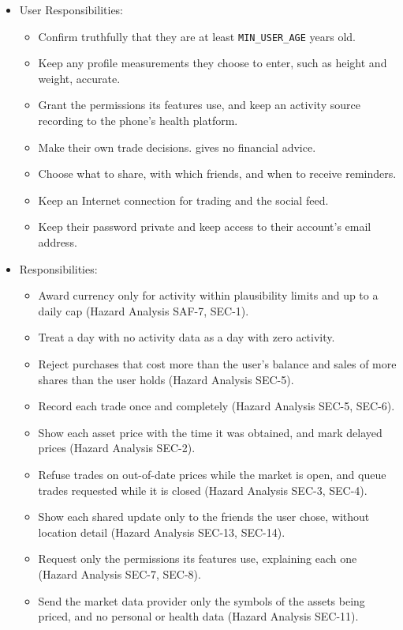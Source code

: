 \documentclass[12pt]{article}
\begin{document}
\begin{itemize}
\item User Responsibilities:
\begin{itemize}
\item Confirm truthfully that they are at least \texttt{MIN\_USER\_AGE} years
  old.
\item Keep any profile measurements they choose to enter, such as height and
  weight, accurate.
\item Grant \progname{} the permissions its features use, and keep an activity
  source recording to the phone's health platform.
\item Make their own trade decisions. \progname{} gives no financial advice.
\item Choose what to share, with which friends, and when to receive reminders.
\item Keep an Internet connection for trading and the social feed.
\item Keep their password private and keep access to their account's email
  address.
\end{itemize}
\item \progname{} Responsibilities:
\begin{itemize}
\item Award currency only for activity within plausibility limits and up to a
  daily cap (Hazard Analysis SAF-7, SEC-1).
\item Treat a day with no activity data as a day with zero activity.
\item Reject purchases that cost more than the user's balance and sales of
  more shares than the user holds (Hazard Analysis SEC-5).
\item Record each trade once and completely (Hazard Analysis SEC-5, SEC-6).
\item Show each asset price with the time it was obtained, and mark delayed
  prices (Hazard Analysis SEC-2).
\item Refuse trades on out-of-date prices while the market is open, and queue
  trades requested while it is closed (Hazard Analysis SEC-3, SEC-4).
\item Show each shared update only to the friends the user chose, without
  location detail (Hazard Analysis SEC-13, SEC-14).
\item Request only the permissions its features use, explaining each one
  (Hazard Analysis SEC-7, SEC-8).
\item Send the market data provider only the symbols of the assets being
  priced, and no personal or health data (Hazard Analysis SEC-11).

\end{itemize}
\end{itemize}
\end{document}
